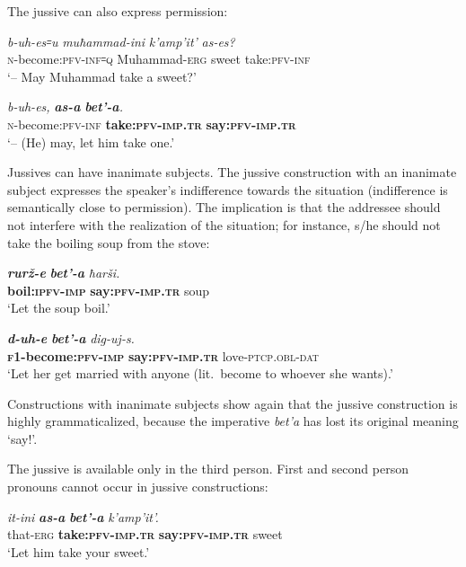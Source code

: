 ﻿\documentclass[output=paper]{langsci/langscibook}
\begin{document}
The jussive can also express permission:

\ea %
\gll \emph{b-uh-es꞊u} \emph{muħammad-ini} \emph{k'amp'it'} \emph{as-es?}\\
 \textsc{n}-become:\textsc{pfv}-\textsc{inf}꞊\textsc{q} Muhammad-\textsc{erg} sweet take:\textsc{pfv}-\textsc{inf}\\
\glt `– May Muhammad take a sweet?'

\gll \emph{b-uh-es,} \emph{\textbf{as-a}} \emph{\textbf{bet'-a}.}\\
\textsc{n}-become:\textsc{pfv}-\textsc{inf} \textbf{take:\textsc{pfv}-\textsc{imp}.\textsc{tr}} \textbf{say:\textsc{pfv}-\textsc{imp}.\textsc{tr}}\\
\glt `– (He) may, let him take one.'
\z

Jussives can have inanimate subjects. The jussive construction with an
inanimate subject expresses the speaker's indifference towards the
situation (indifference is semantically close to permission). The
implication is that the addressee should not interfere with the
realization of the situation; for instance, s/he should not take the
boiling soup from the stove:

\ea %
\gll \emph{\textbf{rurž-e}} \emph{\textbf{bet'-a}} \emph{ħarši.}\\
 \textbf{boil:\textsc{ipfv}-\textsc{imp}} \textbf{say:\textsc{pfv}-\textsc{imp}.\textsc{tr}} soup\\
\glt `Let the soup boil.'

\ex %
\gll \emph{\textbf{d-uh-e}} \emph{\textbf{bet'-a}} \emph{dig-uj-s.}\\
 \textbf{\textsc{f1}-become:\textsc{pfv}-\textsc{imp}} \textbf{say:\textsc{pfv}-\textsc{imp}.\textsc{tr}} love-\textsc{ptcp}.\textsc{obl}-\textsc{dat}\\
\glt `Let her get married with anyone (lit.\ become to whoever she wants).'
\z

Constructions with inanimate subjects show again that the jussive
construction is highly grammaticalized, because the imperative
\emph{bet'a} has lost its original meaning `say!'.

The jussive is available only in the third person. First and second
person pronouns cannot occur in jussive constructions:

\ea %
\gll \emph{it-ini} \emph{\textbf{as-a}} \emph{\textbf{bet'-a}} \emph{k'amp'it'.}\\
 that-\textsc{erg} \textbf{take:\textsc{pfv}-\textsc{imp}.\textsc{tr}} \textbf{say:\textsc{pfv}-\textsc{imp}.\textsc{tr}} sweet\\
\glt `Let him take your sweet.'
\end{document}
